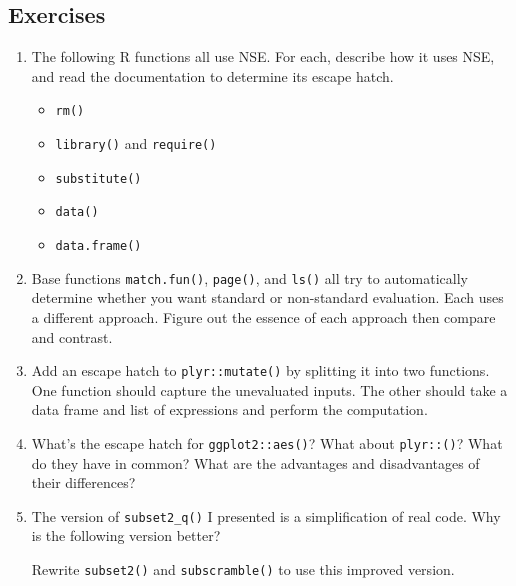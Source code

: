 \subsection{Exercises}

\begin{enumerate}
\def\labelenumi{\arabic{enumi}.}
\item
  The following R functions all use NSE. For each, describe how it uses
  NSE, and read the documentation to determine its escape hatch.

  \begin{itemize}
  \itemsep1pt\parskip0pt
  \item
    \texttt{rm()}
  \item
    \texttt{library()} and \texttt{require()}
  \item
    \texttt{substitute()}
  \item
    \texttt{data()}
  \item
    \texttt{data.frame()}
  \end{itemize}
\item
  Base functions \texttt{match.fun()}, \texttt{page()}, and
  \texttt{ls()} all try to automatically determine whether you want
  standard or non-standard evaluation. Each uses a different approach.
  Figure out the essence of each approach then compare and contrast.
\item
  Add an escape hatch to \texttt{plyr::mutate()} by splitting it into
  two functions. One function should capture the unevaluated inputs. The
  other should take a data frame and list of expressions and perform the
  computation.
\item
  What's the escape hatch for \texttt{ggplot2::aes()}? What about
  \texttt{plyr::()}? What do they have in common? What are the
  advantages and disadvantages of their differences?
\item
  The version of \texttt{subset2\_q()} I presented is a simplification
  of real code. Why is the following version better?

\begin{Shaded}
\begin{Highlighting}[]
\StringTok{ } \NormalTok{()) \{}
  \StringTok{ }
\NormalTok{\}}
\end{Highlighting}
\end{Shaded}

  Rewrite \texttt{subset2()} and \texttt{subscramble()} to use this
  improved version.
\end{enumerate}

